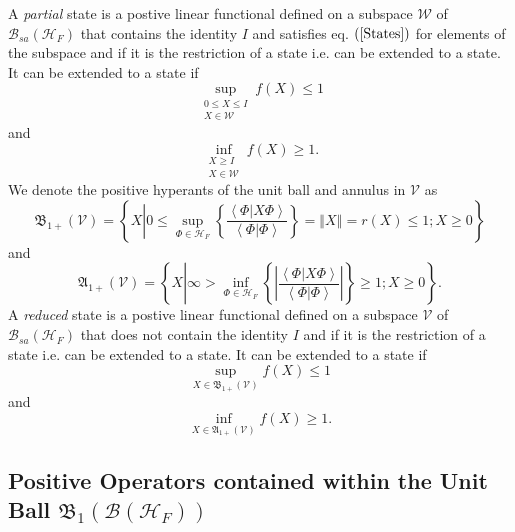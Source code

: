 \documentclass[aps,preprint]{revtex4}%
\begin{document}
A \emph{partial} state is a postive linear functional defined on a subspace
$\mathcal{W}$ of $\mathcal{B}_{sa}\left(  \mathcal{H}_{F}\right)  $ that
contains the identity $I$ and satisfies eq. $\left(  \ref{States}\right)  $
for elements of the subspace and if it is the restriction of a state i.e. can
be extended to a state. It can be extended to a state if
\begin{equation}
\sup_{\substack{0\leq X\leq I\\X\in\mathcal{W}}}f\left(  X\right)  \leq1
\label{LessI}%
\end{equation}
and%
\begin{equation}
\inf_{\substack{X\geq I\\X\in\mathcal{W}}}f\left(  X\right)  \geq1.
\label{MoreI}%
\end{equation}
We denote the positive hyperants of the unit ball and annulus in $\mathcal{V}$
as
\begin{equation}
\mathfrak{B}_{1+}\left(  \mathcal{V}\right)  =\left\{  X\left\vert 0\leq
\sup_{\Phi\in\mathcal{H}_{F}}\left\{  \frac{\left\langle \left.
\Phi\right\vert X\Phi\right\rangle }{\left\langle \left.  \Phi\right\vert
\Phi\right\rangle }\right\}  =\left\Vert X\right\Vert =r\left(  X\right)
\leq1;X\geq0\right.  \right\}
\end{equation}
and
\begin{equation}
\mathfrak{A}_{1+}\left(  \mathcal{V}\right)  =\left\{  X\left\vert \infty
>\inf_{\Phi\in\mathcal{H}_{F}}\left\{  \left\vert \frac{\left\langle \left.
\Phi\right\vert X\Phi\right\rangle }{\left\langle \left.  \Phi\right\vert
\Phi\right\rangle }\right\vert \right\}  \geq1;X\geq0\right.  \right\}  .
\end{equation}
A \emph{reduced} state is a postive linear functional defined on a subspace
$\mathcal{V}$ of $\mathcal{B}_{sa}\left(  \mathcal{H}_{F}\right)  $ that does
not contain the identity $I$ and if it is the restriction of a state i.e. can
be extended to a state. It can be extended to a state if
\begin{equation}
\sup_{X\in\mathfrak{B}_{1+}\left(  \mathcal{V}\right)  }f\left(  X\right)
\leq1
\end{equation}
and%
\begin{equation}
\inf_{X\in\mathfrak{A}_{1+}\left(  \mathcal{V}\right)  }f\left(  X\right)
\geq1.
\end{equation}


\subsection{Positive Operators contained within the Unit Ball $\mathfrak{B}%
_{1}\left(  \mathcal{B}\left(  \mathcal{H}_{F}\right)  \right)  $}
\end{document}

